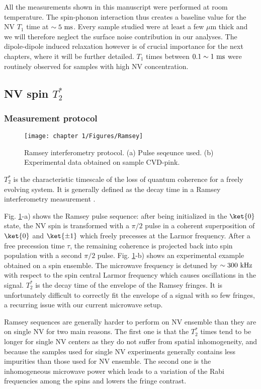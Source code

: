 \documentclass[a4paper, 11pt]{report}
\begin{document}
All the measurements shown in this manuscript were performed at room temperature. The spin-phonon interaction thus creates a baseline value for the NV $T_1$ time at $\sim 5\ \rm ms$. Every sample studied were at least a few $\mu$m thick and we will therefore neglect the surface noise contribution in our analyses. The dipole-dipole induced relaxation however is of crucial importance for the next chapters, where it will be further detailed. $T_1$ times between $0.1 \sim 1\ \rm ms$ were routinely observed for samples with high NV concentration.

\subsection{NV spin $T_2^*$}
\subsubsection{Measurement protocol}
\begin{figure}[h!]
\centering
\texttt{[image: chapter 1/Figures/Ramsey]}
\caption{Ramsey interferometry protocol. (a) Pulse seqeunce used. (b) Experimental data obtained on sample CVD-pink.} %
\label{Ramsey}
\end{figure}

$T_2^*$ is the characteristic timescale of the loss of quantum coherence for a freely evolving system. It is generally defined as the decay time in a Ramsey interferometry measurement \citep{barry2020sensitivity}.

Fig. \ref{Ramsey}-a) shows the Ramsey pulse sequence: after being initialized in the $\ket{0}$ state, the NV spin is transformed with a $\pi/2$ pulse in a coherent superposition of $\ket{0}$ and $\ket{\pm 1}$ which freely precesses at the Larmor frequency. After a free precession time $\tau$, the remaining coherence is projected back into spin population with a second $\pi/2$ pulse. Fig. \ref{Ramsey}-b) shows an experimental example obtained on a spin ensemble. The microwave frequency is detuned by $\sim 300\ \rm kHz$ with respect to the spin central Larmor frequency which causes oscillations in the signal. $T_2^*$ is the decay time of the envelope of the Ramsey fringes. It is unfortunately difficult to correctly fit the envelope of a signal with so few fringes, a recurring issue with our current microwave setup. 

Ramsey sequences are generally harder to perform on NV ensemble than they are on single NV for two main reasons. The first one is that the $T_2^*$ times tend to be longer for single NV centers as they do not suffer from spatial inhomogeneity, and because the samples used for single NV experiments generally contains less impurities than those used for NV ensemble. The second one is the inhomogeneous microwave power which leads to a variation of the Rabi frequencies among the spins \citep{barry2016optical, zhou2020quantum} and lowers the fringe contrast.
\end{document}
